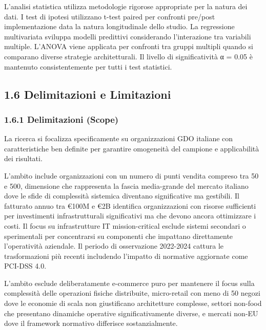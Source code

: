 \documentclass{report}
\begin{document}
L'analisi statistica utilizza metodologie rigorose appropriate per la
natura dei dati. I test di ipotesi utilizzano t-test paired per
confronti pre/post implementazione data la natura longitudinale dello
studio. La regressione multivariata sviluppa modelli predittivi
considerando l'interazione tra variabili multiple. L'ANOVA viene
applicata per confronti tra gruppi multipli quando si comparano diverse
strategie architetturali. Il livello di significatività α = 0.05 è
mantenuto consistentemente per tutti i test statistici.

\subsection{\texorpdfstring{\textbf{1.6 Delimitazioni e
Limitazioni}}{1.6 Delimitazioni e Limitazioni}}\label{delimitazioni-e-limitazioni}

\subsubsection{\texorpdfstring{\textbf{1.6.1 Delimitazioni
(Scope)}}{1.6.1 Delimitazioni (Scope)}}\label{delimitazioni-scope}

La ricerca si focalizza specificamente su organizzazioni GDO italiane
con caratteristiche ben definite per garantire omogeneità del campione e
applicabilità dei risultati.

L'ambito include organizzazioni con un numero di punti vendita compreso
tra 50 e 500, dimensione che rappresenta la fascia media-grande del
mercato italiano dove le sfide di complessità sistemica diventano
significative ma gestibili. Il fatturato annuo tra €100M e €2B
identifica organizzazioni con risorse sufficienti per investimenti
infrastrutturali significativi ma che devono ancora ottimizzare i costi.
Il focus su infrastrutture IT mission-critical esclude sistemi secondari
o sperimentali per concentrarsi su componenti che impattano direttamente
l'operatività aziendale. Il periodo di osservazione 2022-2024 cattura le
trasformazioni più recenti includendo l'impatto di normative aggiornate
come PCI-DSS 4.0.

L'ambito esclude deliberatamente e-commerce puro per mantenere il focus
sulla complessità delle operazioni fisiche distribuite, micro-retail con
meno di 50 negozi dove le economie di scala non giustificano
architetture complesse, settori non-food che presentano dinamiche
operative significativamente diverse, e mercati non-EU dove il framework
normativo differisce sostanzialmente.
\end{document}

